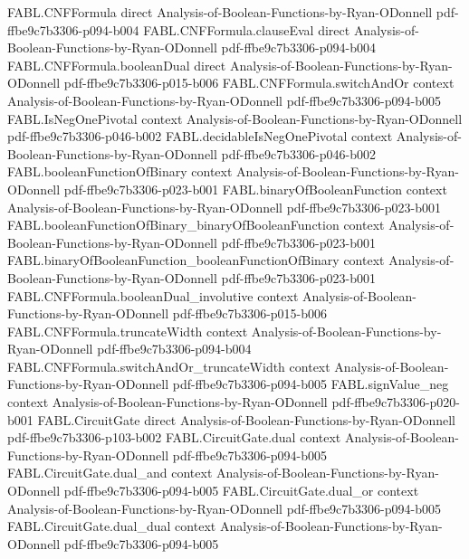 \begin{theorem}
\proofstep
  {FABL.CNFFormula}
  {direct}
  {Analysis-of-Boolean-Functions-by-Ryan-ODonnell}
  {pdf-ffbe9c7b3306-p094-b004}
\proofstep
  {FABL.CNFFormula.clauseEval}
  {direct}
  {Analysis-of-Boolean-Functions-by-Ryan-ODonnell}
  {pdf-ffbe9c7b3306-p094-b004}
\proofstep
  {FABL.CNFFormula.booleanDual}
  {direct}
  {Analysis-of-Boolean-Functions-by-Ryan-ODonnell}
  {pdf-ffbe9c7b3306-p015-b006}
\proofstep
  {FABL.CNFFormula.switchAndOr}
  {context}
  {Analysis-of-Boolean-Functions-by-Ryan-ODonnell}
  {pdf-ffbe9c7b3306-p094-b005}
\proofstep
  {FABL.IsNegOnePivotal}
  {context}
  {Analysis-of-Boolean-Functions-by-Ryan-ODonnell}
  {pdf-ffbe9c7b3306-p046-b002}
\proofstep
  {FABL.decidableIsNegOnePivotal}
  {context}
  {Analysis-of-Boolean-Functions-by-Ryan-ODonnell}
  {pdf-ffbe9c7b3306-p046-b002}
\proofstep
  {FABL.booleanFunctionOfBinary}
  {context}
  {Analysis-of-Boolean-Functions-by-Ryan-ODonnell}
  {pdf-ffbe9c7b3306-p023-b001}
\proofstep
  {FABL.binaryOfBooleanFunction}
  {context}
  {Analysis-of-Boolean-Functions-by-Ryan-ODonnell}
  {pdf-ffbe9c7b3306-p023-b001}
\proofstep
  {FABL.booleanFunctionOfBinary_binaryOfBooleanFunction}
  {context}
  {Analysis-of-Boolean-Functions-by-Ryan-ODonnell}
  {pdf-ffbe9c7b3306-p023-b001}
\proofstep
  {FABL.binaryOfBooleanFunction_booleanFunctionOfBinary}
  {context}
  {Analysis-of-Boolean-Functions-by-Ryan-ODonnell}
  {pdf-ffbe9c7b3306-p023-b001}
\proofstep
  {FABL.CNFFormula.booleanDual_involutive}
  {context}
  {Analysis-of-Boolean-Functions-by-Ryan-ODonnell}
  {pdf-ffbe9c7b3306-p015-b006}
\proofstep
  {FABL.CNFFormula.truncateWidth}
  {context}
  {Analysis-of-Boolean-Functions-by-Ryan-ODonnell}
  {pdf-ffbe9c7b3306-p094-b004}
\proofstep
  {FABL.CNFFormula.switchAndOr_truncateWidth}
  {context}
  {Analysis-of-Boolean-Functions-by-Ryan-ODonnell}
  {pdf-ffbe9c7b3306-p094-b005}
\proofstep
  {FABL.signValue_neg}
  {context}
  {Analysis-of-Boolean-Functions-by-Ryan-ODonnell}
  {pdf-ffbe9c7b3306-p020-b001}
\proofstep
  {FABL.CircuitGate}
  {direct}
  {Analysis-of-Boolean-Functions-by-Ryan-ODonnell}
  {pdf-ffbe9c7b3306-p103-b002}
\proofstep
  {FABL.CircuitGate.dual}
  {context}
  {Analysis-of-Boolean-Functions-by-Ryan-ODonnell}
  {pdf-ffbe9c7b3306-p094-b005}
\proofstep
  {FABL.CircuitGate.dual_and}
  {context}
  {Analysis-of-Boolean-Functions-by-Ryan-ODonnell}
  {pdf-ffbe9c7b3306-p094-b005}
\proofstep
  {FABL.CircuitGate.dual_or}
  {context}
  {Analysis-of-Boolean-Functions-by-Ryan-ODonnell}
  {pdf-ffbe9c7b3306-p094-b005}
\proofstep
  {FABL.CircuitGate.dual_dual}
  {context}
  {Analysis-of-Boolean-Functions-by-Ryan-ODonnell}
  {pdf-ffbe9c7b3306-p094-b005}

\end{theorem}
